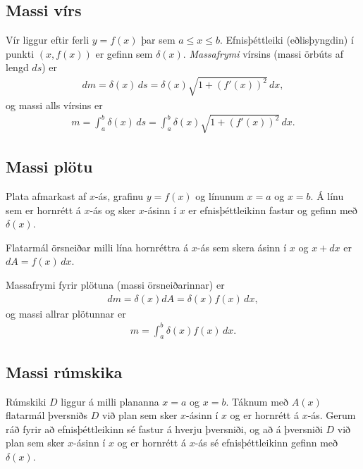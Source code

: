 \documentclass[b5paper,11pt,icelandic]{sphinxmanual}
\begin{document}
\subsection{Massi vírs}
\label{kafli07:massi-virs}\label{kafli07:index-10}
Vír liggur eftir ferli \(y=f(x)\) þar sem \(a\leq x\leq b\).
Efnisþéttleiki (eðlisþyngdin) í punkti \((x, f(x))\) er gefinn sem
\(\delta(x)\). \emph{Massafrymi} vírsins (massi örbúts af lengd
\(ds\)) er
\begin{equation*}
\begin{split}dm
= \delta(x)\, ds
=\delta(x)\sqrt{1+(f'(x))^2}\, dx,\end{split}
\end{equation*}
og massi alls vírsins er
\begin{equation*}
\begin{split}m=\int_a^b \delta(x)\,ds=\int_a^b \delta(x)\sqrt{1+(f'(x))^2}\, dx.\end{split}
\end{equation*}

\subsection{Massi plötu}
\label{kafli07:index-11}\label{kafli07:massi-plotu}\label{kafli07:id4}
Plata afmarkast af \(x\)-ás, grafinu \(y=f(x)\) og línunum
\(x=a\) og \(x=b\). Á línu sem er hornrétt á \(x\)-ás og
sker \(x\)-ásinn í \(x\) er efnisþéttleikinn fastur og gefinn
með \(\delta(x)\).

Flatarmál örsneiðar milli lína hornréttra á \(x\)-ás sem skera ásinn
í \(x\) og \(x+dx\) er \(dA=f(x)\,dx\).

Massafrymi fyrir plötuna (massi örsneiðarinnar) er
\begin{equation*}
\begin{split}dm =\delta(x)dA = \delta(x) f(x)\,dx,\end{split}
\end{equation*}
og massi allrar plötunnar er
\begin{equation*}
\begin{split}m=\int_a^b \delta(x)f(x)\,dx.\end{split}
\end{equation*}

\subsection{Massi rúmskika}
\label{kafli07:index-12}\label{kafli07:massi-rumskika}
Rúmskiki \(D\) liggur á milli plananna \(x=a\) og \(x=b\).
Táknum með \(A(x)\) flatarmál þversniðs \(D\) við plan sem sker
\(x\)-ásinn í \(x\) og er hornrétt á \(x\)-ás. Gerum ráð
fyrir að efnisþéttleikinn sé fastur á hverju þversniði, og að á
þversniði \(D\) við plan sem sker \(x\)-ásinn í \(x\) og er
hornrétt á \(x\)-ás sé efnisþéttleikinn gefinn með
\(\delta(x)\).
\end{document}

